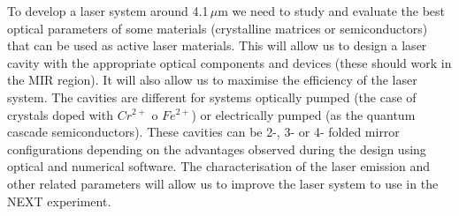 \begin{itemize}
To develop a laser system around 4.1\,$\mu$m we need to study and evaluate the best optical parameters of some materials (crystalline matrices or semiconductors) that can be used as active laser materials.  This will allow us to design a laser cavity with the appropriate  optical components and devices (these should work in the MIR region). It will also allow us to maximise the efficiency of the laser system. The cavities are different for systems optically pumped (the case of crystals doped with $Cr^{2+}$ o $Fe^{2+}$) or electrically pumped (as the quantum cascade semiconductors). These cavities can be 2-, 3- or 4- folded mirror configurations depending on the advantages observed during the design using optical and numerical software. The characterisation of the laser emission and other related parameters will allow us  to improve the laser system to use in the NEXT experiment. 

\end{itemize}

%
%
%
%
%
%
%
%
